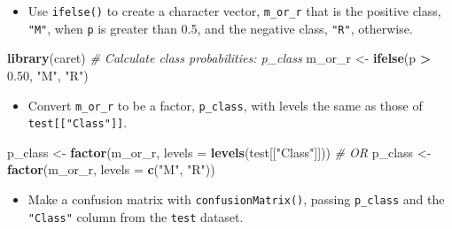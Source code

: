 \documentclass[]{book}
\newenvironment{Shaded}{\begin{snugshade}}{\end{snugshade}}
\newcommand{\KeywordTok}[1]{\textcolor[rgb]{0.13,0.29,0.53}{\textbf{#1}}}
\newcommand{\DataTypeTok}[1]{\textcolor[rgb]{0.13,0.29,0.53}{#1}}
\newcommand{\FloatTok}[1]{\textcolor[rgb]{0.00,0.00,0.81}{#1}}
\newcommand{\StringTok}[1]{\textcolor[rgb]{0.31,0.60,0.02}{#1}}
\newcommand{\CommentTok}[1]{\textcolor[rgb]{0.56,0.35,0.01}{\textit{#1}}}
\newcommand{\OperatorTok}[1]{\textcolor[rgb]{0.81,0.36,0.00}{\textbf{#1}}}
\newcommand{\NormalTok}[1]{#1}
\providecommand{\tightlist}{%
  \setlength{\itemsep}{0pt}\setlength{\parskip}{0pt}}
\begin{document}
\begin{itemize}
\tightlist
\item
  Use \texttt{ifelse()} to create a character vector, \texttt{m\_or\_r}
  that is the positive class, \texttt{"M"}, when \texttt{p} is greater
  than 0.5, and the negative class, \texttt{"R"}, otherwise.
\end{itemize}

\begin{Shaded}
\begin{Highlighting}[]
\KeywordTok{library}\NormalTok{(caret)}
\CommentTok{# Calculate class probabilities: p_class}
\NormalTok{m_or_r <-}\StringTok{ }\KeywordTok{ifelse}\NormalTok{(p }\OperatorTok{>}\StringTok{ }\FloatTok{0.50}\NormalTok{, }\StringTok{"M"}\NormalTok{, }\StringTok{"R"}\NormalTok{)}
\end{Highlighting}
\end{Shaded}

\begin{itemize}
\tightlist
\item
  Convert \texttt{m\_or\_r} to be a factor, \texttt{p\_class}, with
  levels the same as those of \texttt{test{[}{[}"Class"{]}{]}}.
\end{itemize}

\begin{Shaded}
\begin{Highlighting}[]
\NormalTok{p_class <-}\StringTok{ }\KeywordTok{factor}\NormalTok{(m_or_r, }\DataTypeTok{levels =} \KeywordTok{levels}\NormalTok{(test[[}\StringTok{"Class"}\NormalTok{]]))}
\CommentTok{# OR}
\NormalTok{p_class <-}\StringTok{ }\KeywordTok{factor}\NormalTok{(m_or_r, }\DataTypeTok{levels =} \KeywordTok{c}\NormalTok{(}\StringTok{"M"}\NormalTok{, }\StringTok{"R"}\NormalTok{))}
\end{Highlighting}
\end{Shaded}

\begin{itemize}
\tightlist
\item
  Make a confusion matrix with \texttt{confusionMatrix()}, passing
  \texttt{p\_class} and the \texttt{"Class"} column from the
  \texttt{test} dataset.
\end{itemize}

\begin{Shaded}
\end{Shaded}
\end{document}
